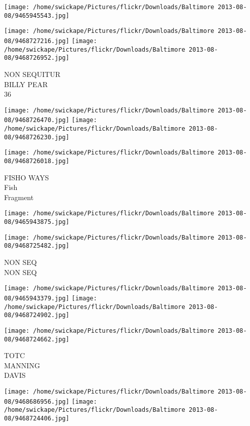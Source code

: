 \documentclass[10pt,letterpaper]{article}
\begin{document}
\texttt{[image: /home/swickape/Pictures/flickr/Downloads/Baltimore 2013-08-08/9465945543.jpg]}

\vspace{0.25in}
\texttt{[image: /home/swickape/Pictures/flickr/Downloads/Baltimore 2013-08-08/9468727216.jpg]}
\texttt{[image: /home/swickape/Pictures/flickr/Downloads/Baltimore 2013-08-08/9468726952.jpg]}

NON SEQUITUR\\
BILLY PEAR\\
36
\pagebreak

\texttt{[image: /home/swickape/Pictures/flickr/Downloads/Baltimore 2013-08-08/9468726470.jpg]}
\texttt{[image: /home/swickape/Pictures/flickr/Downloads/Baltimore 2013-08-08/9468726230.jpg]}

\vspace{0.25in}
\texttt{[image: /home/swickape/Pictures/flickr/Downloads/Baltimore 2013-08-08/9468726018.jpg]}

FISHO WAYS\\
Fish\\
Fragment
\pagebreak

\texttt{[image: /home/swickape/Pictures/flickr/Downloads/Baltimore 2013-08-08/9465943875.jpg]}

\vspace{0.25in}
\texttt{[image: /home/swickape/Pictures/flickr/Downloads/Baltimore 2013-08-08/9468725482.jpg]}

NON SEQ\\
NON SEQ
\pagebreak

\texttt{[image: /home/swickape/Pictures/flickr/Downloads/Baltimore 2013-08-08/9465943379.jpg]}
\texttt{[image: /home/swickape/Pictures/flickr/Downloads/Baltimore 2013-08-08/9468724902.jpg]}

\vspace{0.25in}
\texttt{[image: /home/swickape/Pictures/flickr/Downloads/Baltimore 2013-08-08/9468724662.jpg]}

TOTC\\
MANNING\\
DAVIS
\pagebreak

\texttt{[image: /home/swickape/Pictures/flickr/Downloads/Baltimore 2013-08-08/9468686956.jpg]}
\texttt{[image: /home/swickape/Pictures/flickr/Downloads/Baltimore 2013-08-08/9468724406.jpg]}
\end{document}

